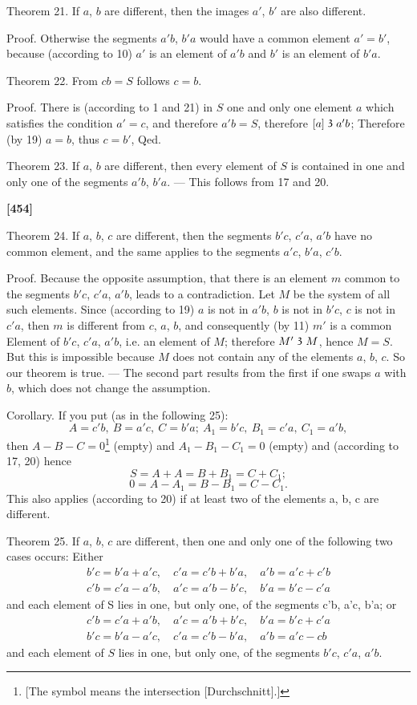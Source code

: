 \documentclass[leqno]{article}
\newcommand\partof{\mathrel{\raisebox{0.45ex}{$\mathfrak{3}$}}}
\begin{document}
Theorem 21. If $a$, $b$ are different, then the images $a'$, $b'$ are also different.

Proof. Otherwise the segments $a'b$, $b'a$ would have a common element $a'=b'$, because (according to 10) $a'$ is an element of $a'b$ and $b'$ is an element of $b'a$.

Theorem 22. From $cb=S$ follows $c = b$.

Proof. There is (according to 1 and 21) in $S$ one and only one element $a$ which satisfies the condition $a'=c$, and therefore $a'b = S$, therefore $[a] \partof a'b$; Therefore (by 19) $a=b$, thus $c=b'$, Qed.

Theorem 23. If $a$, $b$ are different, then every element of $S$ is contained in one and only one of the segments $a'b$, $b'a$. --- This follows from 17 and 20.

\textbf{[454]}

Theorem 24. If $a$, $b$, $c$ are different, then the segments $b'c$, $c'a$, $a'b$ have no common element, and the same applies to the segments $a'c$, $b'a$, $c'b$.

Proof. Because the opposite assumption, that there is an element $m$ common to the segments $b'c$, $c'a$, $a'b$, leads to a contradiction. 
Let $M$ be the system of all such elements. 
Since (according to 19) $a$ is not in $a'b$, $b$ is not in $b'c$, $c$ is not in $c'a$, then $m$ is different from $c$, $a$, $b$, and consequently (by 11) $m'$ is a common Element of $b'c$, $c'a$, $a'b$, i.e. an element of $M$; therefore $M' \partof M$, hence  $M=S$. 
But this is impossible because $M$ does not contain any of the elements $a$, $b$, $c$. So our theorem is true. 
--- The second part results from the first if one swaps $a$ with $b$, which does not change the assumption.

Corollary. If you put (as in the following 25):
\[
    A=c'b,\ B=a'c,\ C = b'a;\ A_1 = b'c,\ B_1 = c'a,\ C_1 = a'b, 
\]
then $A-B-C=0$\footnote{[The symbol means the intersection [Durchschnitt].]} (empty) and $A_1- B_1 - C_1=0$ (empty) and (according to 17, 20) hence
\[
S = A + A = B + B_1 = C +C_1;
\]
\[
0=A-A_1=B-B_1=C-C_1.
\]
This also applies (according to 20) if at least two of the elements a, b, c are different.

Theorem 25. If $a$, $b$, $c$ are different, then one and only one of the following two cases occurs: Either
\begin{multline}
b'c=b'a+a'c,\quad c'a =c'b+b'a,\quad a'b = a'c+c'b \\
c'b=c'a-a'b,\quad a'c=a'b-b'c,\quad b'a=b'c-c'a
\end{multline}
and each element of S lies in one, but only one, of the segments c'b, a'c, b'a; or
\begin{multline}
c'b=c'a+a'b,\quad a'c=a'b+b'c,\quad b'a=b'c + c'a \\
b'c=b'a-a'c,\quad c'a=c'b-b'a,\quad a'b=a'c-cb
\end{multline}
and each element of $S$ lies in one, but only one, of the segments $b'c$, $c'a$, $a'b$.
\end{document}
